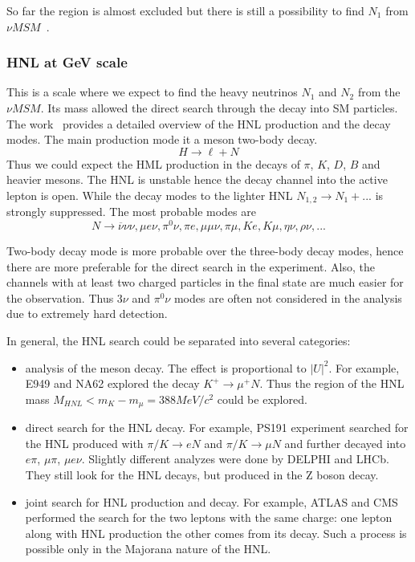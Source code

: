 \documentclass[../main.tex]{subfiles}
\begin{document}
So far the region is almost excluded but there is still a possibility to find $N_1$ from $\nu MSM$~\cite{Caputo2020}.

\subsubsection{HNL at GeV scale}
This is a scale where we expect to find the heavy neutrinos $N_1$ and $N_2$ from the $\nu MSM$. Its mass allowed the direct search through the decay into SM particles. The work~\cite{Gorbunov2007} provides a detailed overview of the HNL production and the decay modes. The main production mode it a meson two-body decay.
\begin{equation}
H\to\ell+N
\end{equation}
Thus we could expect the HML production in the decays of $\pi$, $K$, $D$, $B$ and heavier mesons. The HNL is unstable hence the decay channel into the active lepton is open. While the decay modes to the lighter HNL $N_{1,2}\to N_1+...$ is strongly suppressed. The most probable modes are
\begin{equation}
N\to\overline{\nu}\nu\nu, \mu e\nu, \pi^0\nu, \pi e, \mu\mu\nu, \pi\mu, Ke, K\mu, \eta\nu, \rho\nu,...
\end{equation}

Two-body decay mode is more probable over the three-body decay modes, hence there are more preferable for the direct search in the experiment. Also, the channels with at least two charged particles in the final state are much easier for the observation. Thus $3\nu$ and $\pi^0\nu$ modes are often not considered in the analysis due to extremely hard detection.

In general, the HNL search could be separated into several categories:
\begin{itemize}
  \item analysis of the meson decay. The effect is proportional to $\left|U\right|^2$. For example, E949 and NA62 explored the decay $K^+\to\mu^+N$. Thus the region of the HNL mass $M_{HNL} < m_K-m_\mu=388 MeV/c^2$ could be explored.
  \item direct search for the HNL decay. For example, PS191 experiment searched for the HNL produced with $\pi/K\to eN$ and $\pi/K\to\mu N$ and further decayed into $e\pi$, $\mu\pi$, $\mu e\nu$. Slightly different analyzes were done by DELPHI and LHCb. They still look for the HNL decays, but produced in the Z boson decay.
  \item joint search for HNL production and decay. For example, ATLAS and CMS performed the search for the two leptons with the same charge: one lepton along with HNL production the other comes from its decay. Such a process is possible only in the Majorana nature of the HNL.
\end{itemize}
\end{document}

